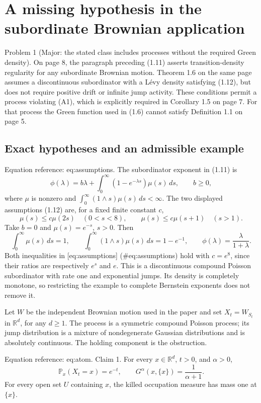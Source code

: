 \documentclass[10pt]{article}
\begin{document}
\section*{A missing hypothesis in the subordinate Brownian application}
Problem 1 (Major: the stated class includes processes without the required Green density).  On page 8, the paragraph preceding (1.11) asserts transition-density regularity for any subordinate Brownian motion. Theorem 1.6 on the same page assumes a discontinuous subordinator with a Lévy density satisfying (1.12), but does not require positive drift or infinite jump activity. These conditions permit a process violating (A1), which is explicitly required in Corollary 1.5 on page 7. For that process the Green function used in (1.6) cannot satisfy Definition 1.1 on page 5.\par
\subsection*{Exact hypotheses and an admissible example}
Equation reference: eq:assumptions. The subordinator exponent in (1.11) is \[\phi(\lambda)=b\lambda+\int_0^\infty(1-e^{-\lambda s})\mu(s)\,ds,
 \qquad b\geq0,\] where \(\mu\) is nonzero and \(\int_0^\infty(1\wedge s)\mu(s)\,ds<\infty\). The two displayed assumptions (1.12) are, for a fixed finite constant \(c\), \[
 \mu(s)\leq c\mu(2s)\quad(0<s<8),\qquad
 \mu(s)\leq c\mu(s+1)\quad(s>1).\] Take \(b=0\) and \(\mu(s)=e^{-s}\), \(s>0\). Then \[\int_0^\infty\mu(s)\,ds=1,\qquad
 \int_0^\infty(1\wedge s)\mu(s)\,ds=1-e^{-1},\qquad
 \phi(\lambda)=\frac{\lambda}{1+\lambda}.\] Both inequalities in [eq:assumptions] (\#eq:assumptions) hold with \(c=e^8\), since their ratios are respectively \(e^s\) and \(e\). This is a discontinuous compound Poisson subordinator with rate one and exponential jumps. Its density is completely monotone, so restricting the example to complete Bernstein exponents does not remove it.\par
Let \(W\) be the independent Brownian motion used in the paper and set \(X_t=W_{S_t}\) in \(\mathbb R^d\), for any \(d\geq1\). The process is a symmetric compound Poisson process; its jump distribution is a mixture of nondegenerate Gaussian distributions and is absolutely continuous. The holding component is the obstruction.\par
Equation reference: eq:atom. Claim 1.  For every \(x\in\mathbb R^d\), \(t>0\), and \(\alpha>0\), \[
 \mathbb P_x(X_t=x)=e^{-t},
 \qquad G^\alpha(x,\{x\})=\frac{1}{\alpha+1}.\] For every open set \(U\) containing \(x\), the killed occupation measure has mass one at \(\{x\}\).\par
\end{document}
